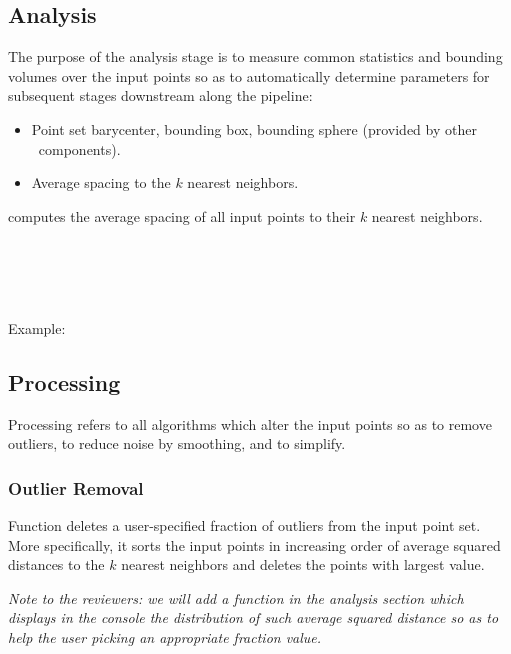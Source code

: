 

\subsection{Analysis}

The purpose of the analysis stage is to measure common statistics and bounding volumes over the input points so as to automatically determine parameters for subsequent stages downstream along the pipeline:
\begin{itemize}
  \item Point set barycenter, bounding box,
        bounding sphere (provided by other \cgal\ components).
  \item Average spacing to the $k$ nearest neighbors.
\end{itemize}

 computes the average spacing of all input points to their $k$ nearest neighbors.

  \\
  \\
  \\
  \\

Example:



\subsection{Processing}

Processing refers to all algorithms which alter the input points so as to remove outliers, to reduce noise by smoothing, and to simplify.

\subsubsection{Outlier Removal}

Function  deletes a user-specified fraction of outliers from the input point set. More specifically, it sorts the input points in increasing order of average squared distances to the $k$ nearest neighbors and deletes the points with largest value.

\emph{Note to the reviewers: we will add a function in the analysis section which displays in the console the distribution of such average squared distance so as to help the user picking an appropriate fraction value.}


